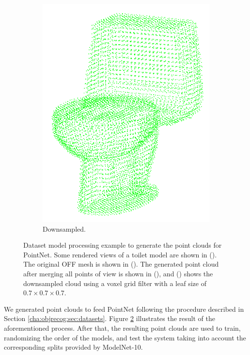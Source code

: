 \begin{figure}[!b]
\begin{subfigure}{0.32\linewidth}
    \includegraphics[width=\linewidth]{Figures/ObjRecog/toilet_cloud_downsampled.png}
    \caption{Downsampled.}
    \label{fig:objrecog:dataproc:downsampled}
  \end{subfigure}
  \caption{Dataset model processing example to generate the point clouds for PointNet. Some rendered views of a toilet model are shown in (). The original \ac{OFF} mesh is shown in (). The generated point cloud after merging all points of view is shown in (), and () shows the downsampled cloud using a voxel grid filter with a leaf size of $0.7 \times 0.7 \times 0.7$.}
  \label{fig:objrecog:pointnetarchdata}
\end{figure}

We generated point clouds to feed PointNet following the procedure described in Section \ref{cha:objrecog:sec:datasets}. Figure \ref{fig:objrecog:pointnetarchdata} illustrates the result of the aforementioned process. After that, the resulting point clouds are used to train, randomizing the order of the models, and test the system taking into account the corresponding splits provided by ModelNet-10.


